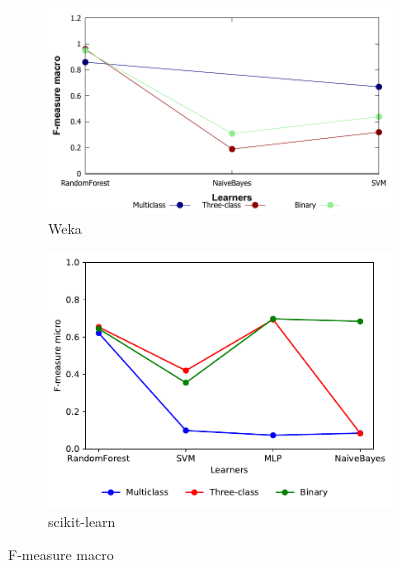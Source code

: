 \begin{figure}[H]
    \centering
    \begin{subfigure}[t]{0.5\textwidth}
        \includegraphics[width=\linewidth]{images/weka_f1macro}
        \caption{Weka}
    \end{subfigure}%
    \begin{subfigure}[t]{0.42\textwidth}
        \includegraphics[width=\linewidth, page = 2]{images/fmeasure}
        \caption{scikit-learn}
    \end{subfigure}
    \caption{F-measure macro}
    \label{fig:f1_macro}
\end{figure}

